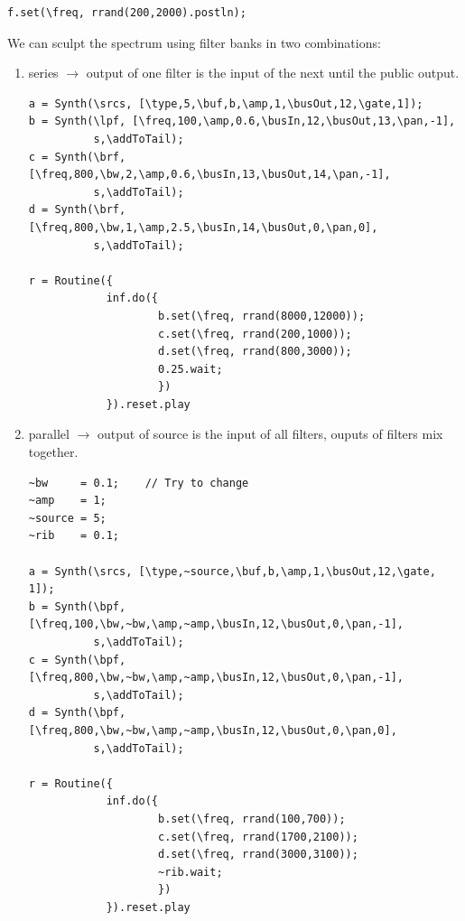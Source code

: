 \begin{lstlisting}[frame=single] 
f.set(\freq, rrand(200,2000).postln);
\end{lstlisting}

We can sculpt the spectrum using filter banks in two combinations:

\begin{enumerate}
\def\labelenumi{\arabic{enumi}.}
\tightlist
\item series \(\rightarrow\) output of one filter is the input of the next until the public output.
\begin{lstlisting}[frame=single] 
a = Synth(\srcs, [\type,5,\buf,b,\amp,1,\busOut,12,\gate,1]);
b = Synth(\lpf, [\freq,100,\amp,0.6,\busIn,12,\busOut,13,\pan,-1],
          s,\addToTail);
c = Synth(\brf, [\freq,800,\bw,2,\amp,0.6,\busIn,13,\busOut,14,\pan,-1],
          s,\addToTail);
d = Synth(\brf, [\freq,800,\bw,1,\amp,2.5,\busIn,14,\busOut,0,\pan,0],
          s,\addToTail);
                    
r = Routine({
            inf.do({
                    b.set(\freq, rrand(8000,12000)); 
                    c.set(\freq, rrand(200,1000));
                    d.set(\freq, rrand(800,3000));
                    0.25.wait;
                    })
            }).reset.play
\end{lstlisting}

\item parallel \(\rightarrow\) output of source is the input of all filters, ouputs of filters mix together.
\begin{lstlisting}[frame=single] 
~bw     = 0.1;    // Try to change
~amp    = 1;
~source = 5;
~rib    = 0.1;

a = Synth(\srcs, [\type,~source,\buf,b,\amp,1,\busOut,12,\gate, 1]);
b = Synth(\bpf, [\freq,100,\bw,~bw,\amp,~amp,\busIn,12,\busOut,0,\pan,-1],
          s,\addToTail);
c = Synth(\bpf, [\freq,800,\bw,~bw,\amp,~amp,\busIn,12,\busOut,0,\pan,-1],
          s,\addToTail);
d = Synth(\bpf, [\freq,800,\bw,~bw,\amp,~amp,\busIn,12,\busOut,0,\pan,0],
          s,\addToTail);
                    
r = Routine({
            inf.do({
                    b.set(\freq, rrand(100,700)); 
                    c.set(\freq, rrand(1700,2100));
                    d.set(\freq, rrand(3000,3100));
                    ~rib.wait;
                    })
            }).reset.play
\end{lstlisting}

\end{enumerate}

